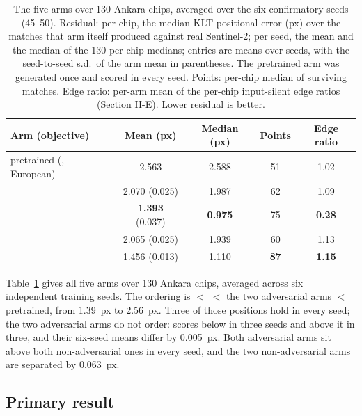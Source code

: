 \begin{table}[t]
\caption{The five arms over 130 Ankara chips, averaged over the six confirmatory seeds
(45--50). Residual: per chip, the median KLT positional error (px) over the matches that
arm itself produced against real Sentinel-2; per seed, the mean and the median of the 130
per-chip medians; entries are means over seeds, with the seed-to-seed s.d.\ of the arm mean
in parentheses. The pretrained arm was generated once and scored in every seed. Points:
per-chip median of surviving matches. Edge ratio: per-arm mean of the per-chip
input-silent edge ratios (Section II-E). Lower residual is better.}
\label{tab:panel}
\centering
\begin{tabular}{@{}lcccc@{}}
\toprule
Arm (objective) & Mean (px) & Median (px) & Points & Edge ratio \\
\midrule
pretrained (\advLPIPS{}, European) & 2.563 & 2.588 & 51 & 1.02 \\
\advLone{} & 2.070 (0.025) & 1.987 & 62 & 1.09 \\
\Lone{} & \textbf{1.393} (0.037) & \textbf{0.975} & 75 & \textbf{0.28} \\
\advLPIPS{} & 2.065 (0.025) & 1.939 & 60 & 1.13 \\
\LPIPSonly{} & 1.456 (0.013) & 1.110 & \textbf{87} & \textbf{1.15} \\
\bottomrule
\end{tabular}
\end{table}

Table~\ref{tab:panel} gives all five arms over 130 Ankara chips, averaged across six
independent training seeds. The ordering is \Lone{} $<$ \LPIPSonly{} $<$ the two
adversarial arms $<$ pretrained, from 1.39~px to 2.56~px. Three of those positions hold
in every seed; the two adversarial arms do not order: \advLPIPS{} scores below
\advLone{} in three seeds and above it in three, and their six-seed means differ by
0.005~px. Both adversarial arms sit above both non-adversarial ones in every seed, and the
two non-adversarial arms are separated by 0.063~px.

\subsection{Primary result}

